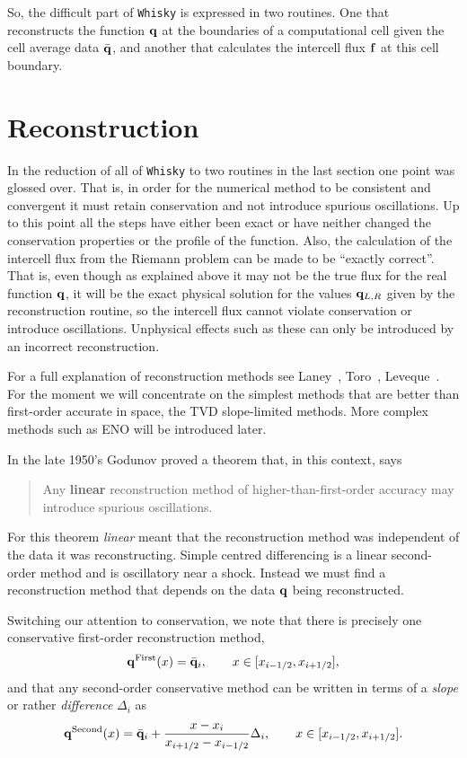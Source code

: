 \documentclass{article}
\begin{document}
So, the difficult part of {\tt Whisky} is expressed in two routines. One that
reconstructs the function ${\bf q}$ at the boundaries of a
computational cell given the cell average data $\bar{{\bf q}}$, and
another that calculates the intercell flux ${\bf f}$ at this cell
boundary. 

\section{Reconstruction}
\label{sec:recon}

In the reduction of all of {\tt Whisky} to two routines in the last section
one point was glossed over. That is, in order for the numerical method
to be consistent and convergent it must retain conservation and not
introduce spurious oscillations. Up to this point all the steps have
either been exact or have neither changed the conservation properties
or the profile of the function. Also, the calculation of the intercell
flux from the Riemann problem can be made to be ``exactly correct''.
That is, even though as explained above it may not be the true flux
for the real function ${\bf q}$, it will be the exact physical
solution for the values ${\bf q}_{L,R}$ given by the reconstruction
routine, so the intercell flux cannot violate conservation or
introduce oscillations.  Unphysical effects such as these can only be
introduced by an incorrect reconstruction.

For a full explanation of reconstruction methods see
Laney~\cite{laney}, Toro~\cite{toro}, Leveque~\cite{leveque}. For the
moment we will concentrate on the simplest methods that are better
than first-order accurate in space, the TVD slope-limited methods.
More complex methods such as ENO will be introduced later.

In the late 1950's Godunov proved a theorem that, in this context,
says
\begin{quote}
Any {\bf linear} reconstruction method of higher-than-first-order
accuracy may introduce spurious oscillations.
\end{quote}
For this theorem {\it linear} meant that the reconstruction method was
independent of the data it was reconstructing. Simple centred
differencing is a linear second-order method and is oscillatory near a
shock. Instead we must find a reconstruction method that depends on
the data ${\bf q}$ being reconstructed.

Switching our attention to conservation, we note that there is
precisely one conservative first-order reconstruction method,
\begin{equation}
  \label{eq:reconfirst}
  {\bf q}^{{\rm First}}(x) = \bar{{\bf q}}_i, \qquad x \in [
  x_{i-1/2}, x_{i+1/2} ], 
\end{equation}
and that any second-order conservative method can be written in terms
of a {\it slope} or rather \emph{difference} $\Delta_i$ as
\begin{equation}
  \label{eq:reconsecond}
  {\bf q}^{{\rm Second}}(x) = \bar{{\bf q}}_i + \frac{x -
  x_i}{x_{i+1/2} - x_{i-1/2}} \Delta_i, \qquad x \in [ x_{i-1/2}, x_{i+1/2} ].
\end{equation}
\end{document}
